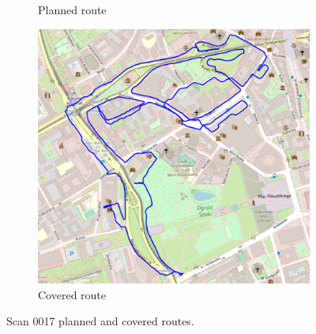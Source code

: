\documentclass[a4paper,12pt]{book}
\begin{document}
\begin{enumerate}
\begin{figure}[H]
\begin{subfigure}{.75\textwidth}
			\caption{Planned route}
			\label{fig:a17}
		\end{subfigure}%
		\linebreak
		\begin{subfigure}{.75\textwidth}
			\centering
			\includegraphics[width=1\linewidth]{route_c17}
			\caption{Covered route}
			\label{fig:b17}
		\end{subfigure}
		\caption{Scan 0017 planned and covered routes.}
		\label{fig:fig17}
	\end{figure} 
\end{enumerate}
\end{document}
